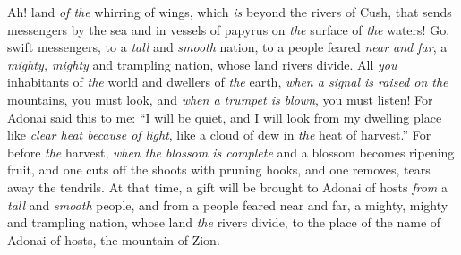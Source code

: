 \begin{biblechapter} %
 Ah! land \textit{of the} whirring of wings, 
which \textit{is} beyond the rivers of Cush,
\verse that sends messengers by the sea 
and in vessels of papyrus on \textit{the} surface of \textit{the} waters! 
Go, swift messengers, to a \textit{tall} and \textit{smooth} nation, 
to a people feared \textit{near and far}, 
a \textit{mighty, mighty} and trampling nation, 
whose land rivers divide.
\verse All \textit{you} inhabitants of \textit{the} world 
and dwellers of \textit{the} earth, 
\textit{when a signal is raised on the} mountains, you must look, 
and \textit{when a trumpet is blown}, you must listen!
\verse For Adonai said this to me:
\verse “I will be quiet, 
and I will look from my dwelling place 
like \textit{clear heat because of light}, 
like a cloud of dew in \textit{the} heat of harvest.”
\verse For before \textit{the} harvest, \textit{when the blossom is complete} 
and a blossom becomes ripening fruit, 
and one cuts off the shoots with pruning hooks, 
and one removes, tears away the tendrils.
\verse At that time, a gift will be brought to Adonai of hosts \textit{from} a \textit{tall} and \textit{smooth} people, 
and from a people feared near and far, 
a mighty, mighty and trampling nation, 
whose land \textit{the} rivers divide, 
to the place of the name of Adonai of hosts, 
the mountain of Zion.
\end{biblechapter}

